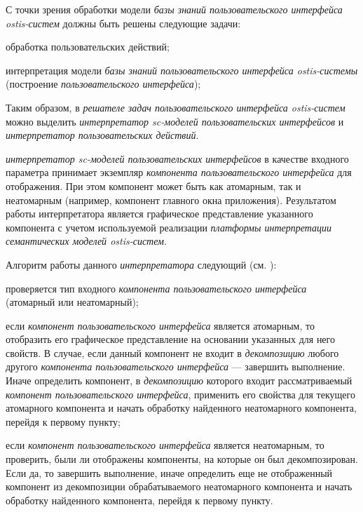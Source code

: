 \bigskip

С точки зрения обработки модели \textit{базы знаний пользовательского интерфейса ostis-систем} должны быть решены следующие задачи:
\begin{textitemize}
	\item обработка пользовательских действий;
	\item интерпретация модели \textit{базы знаний пользовательского интерфейса ostis-системы} (построение \textit{пользовательского интерфейса});
\end{textitemize}

Таким образом, в \textit{решателе задач пользовательского интерфейса ostis-систем} можно выделить \textit{интерпретатор sc-моделей пользовательских интерфейсов} и \textit{интерпретатор пользовательских действий}.

\textit{интерпретатор sc-моделей пользовательских интерфейсов} в качестве входного параметра принимает экземпляр \textit{компонента пользовательского интерфейса} для отображения. При этом компонент может быть как атомарным, так и неатомарным (например, компонент главного окна приложения). Результатом работы интерпретатора является графическое представление указанного компонента с учетом используемой реализации \textit{платформы интерпретации семантических моделей ostis-систем}.

Алгоритм работы данного \textit{интерпретатора} следующий (см. ):
\begin{textitemize}
	\item проверяется тип входного \textit{компонента пользовательского интерфейса} (атомарный или неатомарный);
	\item если \textit{компонент пользовательского интерфейса} является атомарным, то отобразить его графическое представление на основании указанных для него свойств. В случае, если данный компонент не входит в \textit{декомпозицию} любого другого \textit{компонента пользовательского интерфейса} --- завершить выполнение. Иначе определить компонент, в \textit{декомпозицию} которого входит рассматриваемый \textit{компонент пользовательского интерфейса}, применить его свойства для текущего атомарного компонента и начать обработку найденного неатомарного компонента, перейдя к первому пункту;
	\item если \textit{компонент пользовательского интерфейса} является неатомарным, то проверить, были ли отображены компоненты, на которые он был декомпозирован. Если да, то завершить выполнение, иначе определить еще не отображенный компонент из декомпозиции обрабатываемого неатомарного компонента и начать обработку найденного компонента, перейдя к первому пункту.
\end{textitemize}

